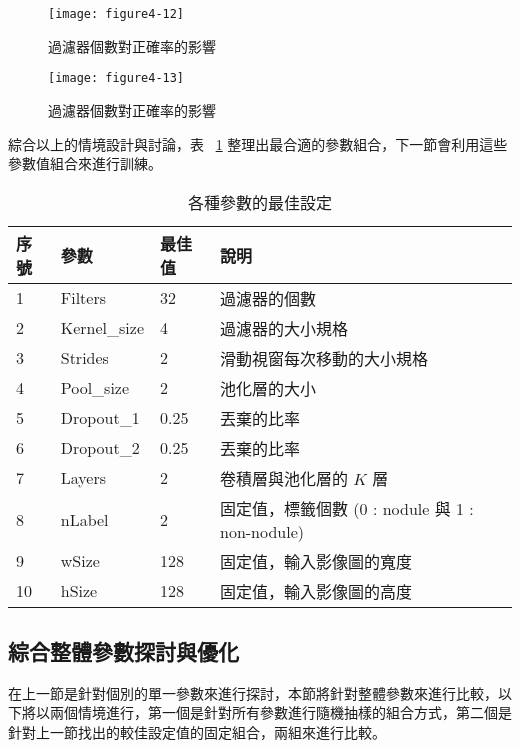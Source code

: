 \documentclass[12pt, a4paper]{article} 				%
\begin{document}
\begin{figure}[!ht]
\begin{center}
\texttt{[image: figure4-12]}
\caption{過濾器個數對正確率的影響}\label{Figure4-12}
\end{center}
\end{figure}

\begin{figure}[!ht]
\begin{center}
\texttt{[image: figure4-13]}
\caption{過濾器個數對正確率的影響}\label{Figure4-13}
\end{center}
\end{figure}

綜合以上的情境設計與討論，表 ~\ref{Table4-7} 整理出最合適的參數組合，下一節會利用這些參數值組合來進行訓練。

\begin{table}[!ht]
\begin{center}
\caption{各種參數的最佳設定}\label{Table4-7}
\begin{tabular}{llll}\toprule
序號	&	參數	&	最佳值	&	說明	\\\midrule
1	&	Filters	&	32	&	過濾器的個數	\\
2	&	Kernel\_size	&	4	&	過濾器的大小規格	\\
3	&	Strides	&	2	&	滑動視窗每次移動的大小規格	\\
4	&	Pool\_size	&	2	&	池化層的大小	\\
5	&	Dropout\_1	&	0.25	&	丟棄的比率	\\
6	&	Dropout\_2	&	0.25	&	丟棄的比率	\\
7	&	Layers	&	2	&	卷積層與池化層的 $K$ 層	\\
8	&	nLabel	&	2	&	固定值，標籤個數	(0 : nodule 與 1 : non-nodule)\\
9	&	wSize	&	128	&	固定值，輸入影像圖的寬度	\\
10	&	hSize	&	128	&	固定值，輸入影像圖的高度	\\\bottomrule
\end{tabular}
\end{center}
\end{table}

\subsection{綜合整體參數探討與優化}
在上一節是針對個別的單一參數來進行探討，本節將針對整體參數來進行比較，以下將以兩個情境進行，第一個是針對所有參數進行隨機抽樣的組合方式，第二個是針對上一節找出的較佳設定值的固定組合，兩組來進行比較。
\end{document}
